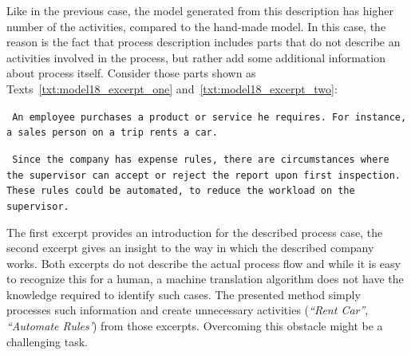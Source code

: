 Like in the previous case, the model generated from this description has higher number of the activities, compared to the hand-made model. In this case, the reason is the fact that process description includes parts that do not describe an activities involved in the process, but rather add some additional information about process itself. Consider those parts shown as Texts~\ref{txt:model18_excerpt_one} and~\ref{txt:model18_excerpt_two}:
\begin{tcolorbox}[
	breakable,
	arc=0mm,
	left=1pt,
	right = 1pt,
	boxrule=0mm,
	colback = {white},
	]
	\texttt{
		An employee purchases a product or service he requires. For instance, a sales person on
		a trip rents a car.	
	}
\end{tcolorbox}
\label{txt:model18_excerpt_one}
\begin{tcolorbox}[
	breakable,
	arc=0mm,
	left=1pt,
	right = 1pt,
	boxrule=0mm,
	colback = {white},
	]
	\texttt{
		Since the company has expense rules, there are circumstances where
		the supervisor can accept or reject the report upon first inspection. These rules could be
		automated, to reduce the workload on the supervisor.	
	}
\end{tcolorbox}
\label{txt:model18_excerpt_two}
The first excerpt provides an introduction for the described process case, the second excerpt gives an insight to the way in which the described company works. Both excerpts do not describe the actual process flow and while it is easy to recognize this for a human, a machine translation algorithm does not have the knowledge required to identify such cases. The presented method simply processes such information and create unnecessary activities (\emph{``Rent Car''}, \emph{``Automate Rules'}) from those excerpts. Overcoming this obstacle might be a challenging task.

